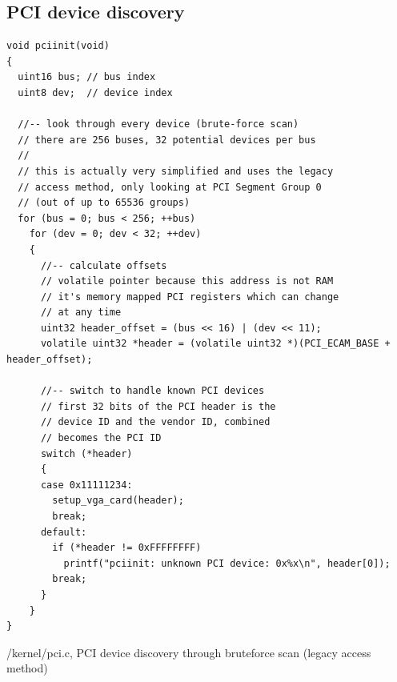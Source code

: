 \begin{appendices}
\section{PCI device discovery}
\label{appendix:c:3}
\begin{listing}[H]
    \begin{verbatim}
void pciinit(void)
{
  uint16 bus; // bus index
  uint8 dev;  // device index

  //-- look through every device (brute-force scan)
  // there are 256 buses, 32 potential devices per bus
  //
  // this is actually very simplified and uses the legacy
  // access method, only looking at PCI Segment Group 0
  // (out of up to 65536 groups)
  for (bus = 0; bus < 256; ++bus)
    for (dev = 0; dev < 32; ++dev)
    {
      //-- calculate offsets
      // volatile pointer because this address is not RAM
      // it's memory mapped PCI registers which can change
      // at any time
      uint32 header_offset = (bus << 16) | (dev << 11);
      volatile uint32 *header = (volatile uint32 *)(PCI_ECAM_BASE + header_offset);

      //-- switch to handle known PCI devices
      // first 32 bits of the PCI header is the
      // device ID and the vendor ID, combined
      // becomes the PCI ID
      switch (*header)
      {
      case 0x11111234:
        setup_vga_card(header);
        break;
      default:
        if (*header != 0xFFFFFFFF)
          printf("pciinit: unknown PCI device: 0x%x\n", header[0]);
        break;
      }
    }
}
    \end{verbatim}
    \caption{/kernel/pci.c, PCI device discovery through bruteforce scan (legacy access method)}
\end{listing}


\end{appendices}
